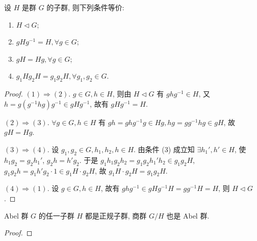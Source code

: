 \documentclass[../../main.tex]{subfiles}
\begin{document}
\begin{theorem}\label{theorem:抽象代数-定理 1.3.5}
设 \( H \) 是群 \( G \) 的子群, 则下列条件等价:
\begin{enumerate}[(1)]
\item \( H \lhd  G \);

\item \( gHg^{-1} = H, \forall g \in G \);

\item \( gH = Hg, \forall g \in G \);

\item \( g_1Hg_2H = g_1g_2H, \forall g_1, g_2 \in G \).
\end{enumerate}
\end{theorem}
\begin{proof}
\( (1) \Rightarrow (2) \). \( g \in G, h \in H \), 则由 \( H \lhd  G \) 有 \( ghg^{-1} \in H \), 又 \( h = g(g^{-1}hg)g^{-1} \in gHg^{-1} \), 故有 \( gHg^{-1} = H \).

\( (2) \Rightarrow (3) \). \( \forall g \in G, h \in H \) 有 \( gh = ghg^{-1}g \in Hg, hg = gg^{-1}hg \in gH \), 故 \( gH = Hg \).

\( (3) \Rightarrow (4) \). 设 \( g_1, g_2 \in G, h_1, h_2, h \in H \). 由条件 (3) 成立知 \( \exists h_1', h' \in H \), 使 \( h_1g_2 = g_2h_1' \), \( g_2h = h'g_2 \). 于是 \( g_1h_1g_2h_2 = g_1g_2h_1'h_2 \in g_1g_2H \), \( g_1g_2h = g_1h'g_2 \cdot 1 \in g_1H \cdot g_2H \), 故 \( g_1H \cdot g_2H = g_1g_2H \).

\( (4) \Rightarrow (1) \). 设 \( g \in G, h \in H \), 故有 \( ghg^{-1} \in gHg^{-1}H = gg^{-1}H = H \), 则 \( H \lhd  G \).
\end{proof}

\begin{proposition}
Abel 群 \( G \) 的任一子群 \( H \) 都是正规子群, 商群 \( G/H \) 也是 Abel 群.
\end{proposition}
\begin{proof}

\end{proof}
\end{document}
